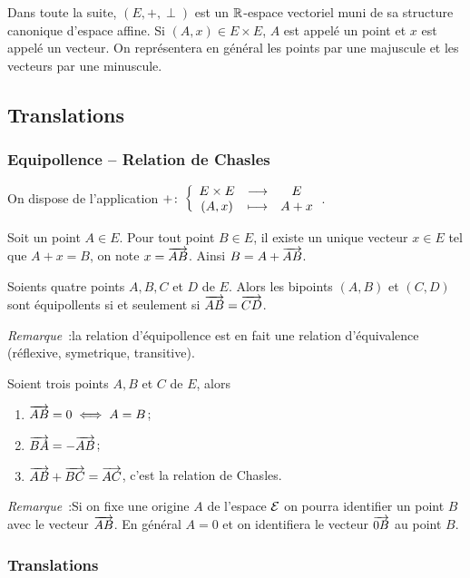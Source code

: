 Dans toute la suite, $(E,+,\perp)$ est un $\mathbb{R}$-espace vectoriel muni de sa structure canonique d'espace affine. Si $(A,x) \in E\times E$, $A$ est appelé un point et $x$ est appelé un vecteur. On représentera en général les points par une majuscule et les vecteurs par une minuscule.

\subsection{Translations}

\subsubsection{Equipollence -- Relation de Chasles}

On dispose de l'application $+\colon \left\{\begin{array}{ccc} E\times E & \longrightarrow &E\\ (A,x) & \longmapsto & A+x \end{array} \right.$.

\begin{defdef}
  Soit un point $A \in E$. Pour tout point $B \in E$, il existe un unique vecteur $x \in E$ tel que $A+x=B$, on note $x=\overrightarrow{AB}$. Ainsi $B=A+\overrightarrow{AB}$.
\end{defdef}
\begin{defdef}
  Soients quatre points $A,B,C$ et $D$ de $E$. Alors les bipoints $(A,B)$ et $(C,D)$ sont équipollents si et seulement si $\overrightarrow{AB}=\overrightarrow{CD}$.
\end{defdef}

\emph{Remarque}~:la relation d'équipollence est en fait une relation d'équivalence (réflexive, symetrique, transitive).

\begin{prop}
  Soient trois points $A,B$ et $C$ de $E$, alors
  \begin{enumerate}
  \item $\overrightarrow{AB}=0 \iff A=B$;
  \item $\overrightarrow{BA}=-\overrightarrow{AB}$;
  \item $\overrightarrow{AB}+\overrightarrow{BC}=\overrightarrow{AC}$, c'est la relation de Chasles.
  \end{enumerate}
\end{prop}

\emph{Remarque}~:Si on fixe une origine $A$ de l'espace $\mathcal{E}$ on pourra identifier un point $B$ avec le vecteur $\overrightarrow{AB}$. En général $A=0$ et on identifiera le vecteur $\overrightarrow{0B}$ au point $B$.

\subsubsection{Translations}

